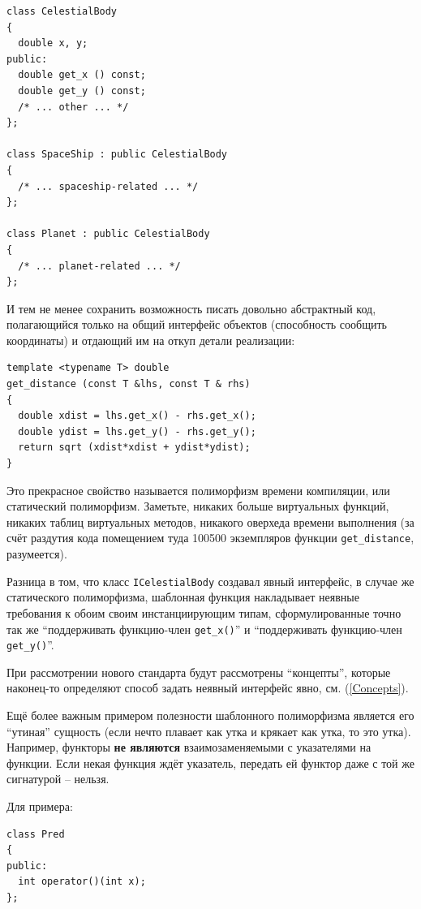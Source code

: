 \documentclass[a4paper,12pt,oneside]{article}
\begin{document}
\begin{lstlisting}
class CelestialBody
{
  double x, y;
public:
  double get_x () const;
  double get_y () const;
  /* ... other ... */ 
};

class SpaceShip : public CelestialBody
{
  /* ... spaceship-related ... */
};

class Planet : public CelestialBody
{
  /* ... planet-related ... */
};
\end{lstlisting}

И тем не менее сохранить возможность писать довольно абстрактный код, полагающийся только на общий интерфейс объектов (способность сообщить координаты) и отдающий им на откуп детали реализации:

\begin{lstlisting}
template <typename T> double
get_distance (const T &lhs, const T & rhs)
{
  double xdist = lhs.get_x() - rhs.get_x();
  double ydist = lhs.get_y() - rhs.get_y();
  return sqrt (xdist*xdist + ydist*ydist);
}
\end{lstlisting}

Это прекрасное свойство называется полиморфизм времени компиляции, или статический полиморфизм. Заметьте, никаких больше виртуальных функций, никаких таблиц виртуальных методов, никакого оверхеда времени выполнения (за счёт раздутия кода помещением туда 100500 экземпляров функции \lstinline!get_distance!, разумеется).

Разница в том, что класс \lstinline!ICelestialBody! создавал явный интерфейс, в случае же статического полиморфизма, шаблонная функция накладывает неявные требования к обоим своим инстанциирующим типам, сформулированные точно так же ``поддерживать функцию-член \lstinline!get_x()!'' и ``поддерживать функцию-член \lstinline!get_y()!''. 

При рассмотрении нового стандарта будут рассмотрены ``концепты'', которые наконец-то определяют способ задать неявный интерфейс явно, см. (\ref{Concepts}).

Ещё более важным примером полезности шаблонного полиморфизма является его ``утиная'' сущность (если нечто плавает как утка и крякает как утка, то это утка). Например, функторы \textbf{не являются} взаимозаменяемыми с указателями на функции. Если некая функция ждёт указатель, передать ей функтор даже с той же сигнатурой -- нельзя. 

Для примера:

\begin{lstlisting}
class Pred
{
public:
  int operator()(int x);
};
\end{lstlisting}
\end{document}
